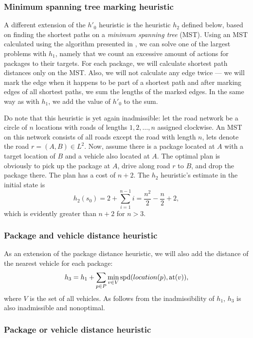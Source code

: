 \subsubsection{Minimum spanning tree marking heuristic}\label{sfa2}

A different extension of the $h'_0$ heuristic
is the heuristic $h_2$ defined below, based
on finding the shortest paths on a \textit{minimum spanning tree} (MST).
Using an MST calculated using the algorithm presented in \citet{Kruskal1956}, we can solve one of the largest problems with $h_1$,
namely that we count an excessive amount of \drive{} actions
for packages to their targets.
For each package, we will calculate
shortest path distances only on the MST.
Also, we will not calculate any edge twice --- we will mark
the edge when it happens to be part of a shortest path and
after marking edges of all shortest paths,
we sum the lengths of the marked edges.
In the same way as with $h_1$, we add the value of $h'_0$ to
the sum.

Do note that this heuristic is yet again inadmissible:
let the road network be a circle of $n$ locations with
roads of lengths $1, 2, \ldots, n$ assigned clockwise.
An MST on this network consists of all roads except the road
with length $n$, lets denote the road $r = (A, B) \in L^2$.
Now, assume there is a package located at $A$ with a target
location of $B$ and a vehicle also located at $A$.
The optimal plan is obviously to pick up the package at $A$,
drive along road $r$ to $B$, and drop the package there.
The plan has a cost of $n+2$. The $h_2$ heuristic's estimate
in the initial state is $$h_2(s_0) = 2 + \sum_{i=1}^{n-1} i = \frac{n^2}{2} - \frac{n}{2} + 2,$$
which is evidently greater than $n+2$ for $n > 3$.

\subsubsection{Package and vehicle distance heuristic}\label{sfa3}

As an extension of the package distance heuristic,
we will also add the distance of the nearest vehicle for
each package:
$$h_3 = h_1 + \sum_{p \in P} \min_{v \in V} \textrm{spd}(location(p), \textrm{at}(v)),$$
where $V$ is the set of all vehicles.
As follows from the inadmissibility of $h_1$, $h_3$
is also inadmissible and nonoptimal.

\subsubsection{Package or vehicle distance heuristic}\label{sfa4}

